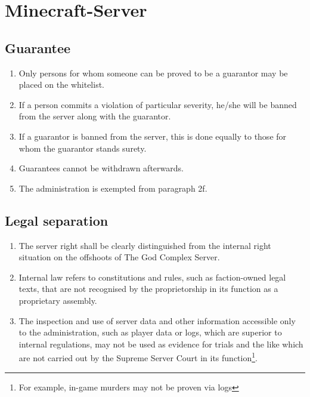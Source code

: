 \documentclass{article}
\begin{document}
\section{Minecraft-Server}

\subsection{Guarantee}
\begin{enumerate}[(1)]
	\item Only persons for whom someone can be proved to be a guarantor may be placed on the whitelist.
	\item If a person commits a violation of particular severity, he/she will be banned from the server along with the guarantor.
	\item If a guarantor is banned from the server, this is done equally to those for whom the guarantor stands surety.
	\item Guarantees cannot be withdrawn afterwards.
	\item The administration is exempted from paragraph 2f.
\end{enumerate}

\subsection{Legal separation}
\begin{enumerate}[(1)]
	\item The server right shall be clearly distinguished from the internal right situation on the offshoots of The God Complex Server.
	\item Internal law refers to constitutions and rules, such as faction-owned legal texts, that are not recognised by the proprietorship in its function as a proprietary assembly.
	\item The inspection and use of server data and other information accessible only to the administration, such as player data or logs, which are superior to internal regulations, may not be used as evidence for trials and the like which are not carried out by the Supreme Server Court in its function\footnote{For example, in-game murders may not be proven via logs}.
\end{enumerate}
\end{document}
